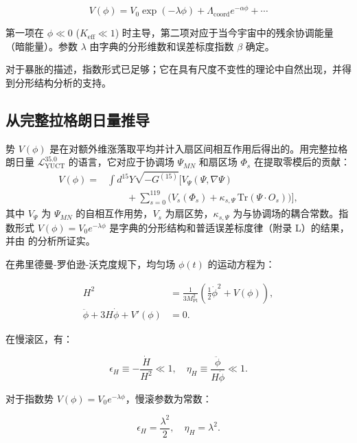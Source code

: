 \documentclass[11pt,a4paper]{article}
\newcommand{\Keff}{K_{\mathrm{eff}}}
\newcommand{\Mpl}{M_{\mathrm{Pl}}}
\begin{document}
	\begin{equation}
		V(\phi) = V_0 \exp\left( -\lambda \phi \right) + \Lambda_{\mathrm{coord}} e^{-\alpha \phi} + \cdots
		\label{eq:potential}
	\end{equation}
	
	第一项在 \(\phi \ll 0\) (\(\Keff \ll 1\)) 时主导，第二项对应于当今宇宙中的残余协调能量（暗能量）。参数 \(\lambda\) 由字典的分形维数和误差标度指数 \(\beta\) 确定。
	
	对于暴胀的描述，指数形式已足够；它在具有尺度不变性的理论中自然出现，并得到分形结构分析的支持。
	
	\subsection{从完整拉格朗日量推导}
	
	势 \(V(\phi)\) 是在对额外维涨落取平均并计入扇区间相互作用后得出的。用完整拉格朗日量 \(\mathcal{L}_{\text{YUCT}}^{35.0}\) 的语言，它对应于协调场 \(\Psi_{MN}\) 和扇区场 \(\Phi_s\) 在提取零模后的贡献：
	\begin{align}
		V(\phi) = &\int d^{15}Y \sqrt{-G^{(15)}} \Big[ V_{\Psi}(\Psi,\nabla\Psi) \nonumber\\
		&\qquad + \sum_{s=0}^{119} \big( V_s(\Phi_s) + \kappa_{s,\Psi}\,\mathrm{Tr}(\Psi\cdot O_s) \big) \Big],
	\end{align}
	其中 \(V_{\Psi}\) 为 \(\Psi_{MN}\) 的自相互作用势，\(V_s\) 为扇区势，\(\kappa_{s,\Psi}\) 为与协调场的耦合常数。指数形式 \(V(\phi)=V_0 e^{-\lambda\phi}\) 是字典的分形结构和普适误差标度律（附录 L）的结果，并由 \cite{Yakushev2026} 的分析所证实。
	
	在弗里德曼-罗伯逊-沃克度规下，均匀场 \(\phi(t)\) 的运动方程为：
	
	\begin{align}
		H^2 &= \frac{1}{3\Mpl^2} \left( \frac{1}{2}\dot{\phi}^2 + V(\phi) \right), \label{eq:friedman1} \\
		\ddot{\phi} + 3H\dot{\phi} + V'(\phi) &= 0. \label{eq:field}
	\end{align}
	
	在慢滚区，有：
	
	\begin{equation}
		\epsilon_H \equiv -\frac{\dot{H}}{H^2} \ll 1, \quad \eta_H \equiv \frac{\ddot{\phi}}{H\dot{\phi}} \ll 1.
	\end{equation}
	
	对于指数势 \(V(\phi) = V_0 e^{-\lambda \phi}\)，慢滚参数为常数：
	
	\begin{equation}
		\epsilon_H = \frac{\lambda^2}{2}, \quad \eta_H = \lambda^2.
		\label{eq:slowroll}
	\end{equation}
	
\end{document}
